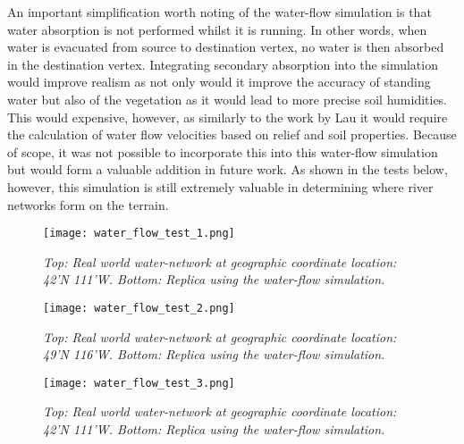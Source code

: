An important simplification worth noting of the water-flow simulation is that water absorption is not performed whilst it is running. In other words, when water is evacuated from source to destination vertex, no water is then absorbed in the destination vertex. Integrating secondary absorption into the simulation would improve realism as not only would it improve the accuracy of standing water but also of the vegetation as it would lead to more precise soil humidities. This would expensive, however, as similarly to the work by Lau \cite{Lau2010a} it would require the calculation of water flow velocities based on relief and soil properties. Because of scope, it was not possible to incorporate this into this water-flow simulation but would form a valuable addition in future work. As shown in the tests below, however, this simulation is still extremely valuable in determining where river networks form on the terrain.

\begin{figure}
\center
	\texttt{[image: water\_flow\_test\_1.png]}
	\caption{ \textit{Top: Real world water-network at geographic coordinate location: 42'N 111'W. Bottom: Replica using the water-flow simulation.}}
	\label{fig:water_flow_test_1}
\end{figure}

\begin{figure}
\center
	\texttt{[image: water\_flow\_test\_2.png]}
	\caption{ \textit{Top: Real world water-network at geographic coordinate location: 49'N 116'W. Bottom: Replica using the water-flow simulation.}}
	\label{fig:water_flow_test_2}
\end{figure}

\begin{figure}
\center
	\texttt{[image: water\_flow\_test\_3.png]}
	\caption{ \textit{Top: Real world water-network at geographic coordinate location: 42'N 111'W. Bottom: Replica using the water-flow simulation.}}
	\label{fig:water_flow_test_3}
\end{figure}